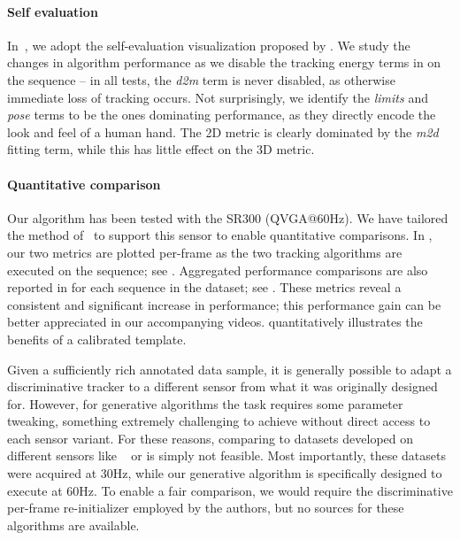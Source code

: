 \paragraph{Self evaluation}
% 
In~, we adopt the self-evaluation visualization proposed by \cite{taylor2016concerto}. We study the changes in algorithm performance as we disable the tracking energy terms in  on the  sequence -- in all tests, the \emph{d2m} term is never disabled, as otherwise immediate loss of tracking occurs. Not surprisingly, we identify the \emph{limits} and \emph{pose} terms to be the ones dominating performance, as they directly encode the look and feel of a human hand. The 2D metric is clearly dominated by the \emph{m2d} fitting term, while this has little effect on the 3D metric. 
% 



\paragraph{Quantitative comparison}
Our algorithm has been tested with the \realsense{} SR300 (QVGA@60Hz).  We have tailored the method of~\cite{tagliasacchi2015robust} to support this sensor to enable quantitative comparisons. In , our two metrics are plotted per-frame as the two tracking algorithms are executed on the  sequence; see \VideoHTrack{}. Aggregated performance comparisons are also reported in  for each sequence in the \handy{} dataset; see \VideoExtra{}. These metrics reveal a consistent and significant increase in performance; this performance gain can be better appreciated in our accompanying videos.  quantitatively illustrates the benefits of a calibrated template.

Given a sufficiently rich annotated data sample, it is generally possible to adapt a discriminative tracker to a different sensor from what it was originally designed for. However, for generative algorithms the task requires some parameter tweaking, something extremely challenging to achieve without direct access to each sensor variant. For these reasons, comparing to datasets developed on different sensors like \dexter{}~\cite{sridhar2013multicam} or \fingerpaint{} \cite{sharp2015accurate} is simply not feasible. Most importantly, these datasets were acquired at 30Hz, while our generative algorithm is specifically designed to execute at 60Hz. To enable a fair comparison, we would require the discriminative per-frame re-initializer employed by the authors, but no sources for these algorithms are available.

